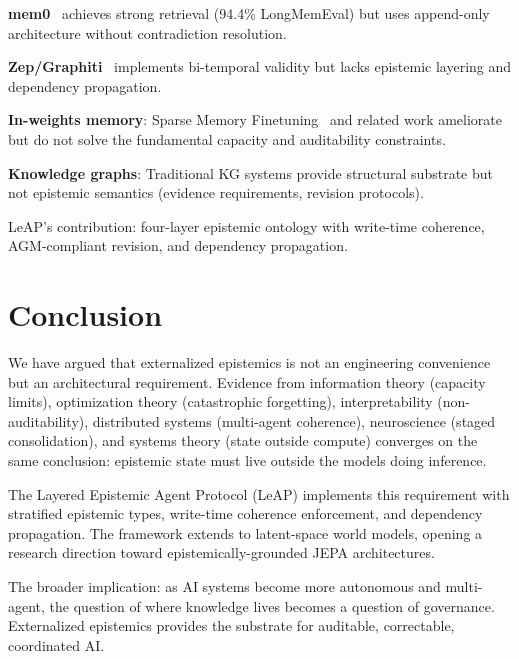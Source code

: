 \documentclass[11pt,letterpaper]{article}
\begin{document}
\textbf{mem0}~\cite{mem0} achieves strong retrieval (94.4\% LongMemEval) but uses append-only architecture without contradiction resolution.

\textbf{Zep/Graphiti}~\cite{graphiti2025} implements bi-temporal validity but lacks epistemic layering and dependency propagation.

\textbf{In-weights memory}: Sparse Memory Finetuning~\cite{sparsemem2025} and related work ameliorate but do not solve the fundamental capacity and auditability constraints.

\textbf{Knowledge graphs}: Traditional KG systems provide structural substrate but not epistemic semantics (evidence requirements, revision protocols).

LeAP's contribution: four-layer epistemic ontology with write-time coherence, AGM-compliant revision, and dependency propagation.

\section{Conclusion}

We have argued that externalized epistemics is not an engineering convenience but an architectural requirement. Evidence from information theory (capacity limits), optimization theory (catastrophic forgetting), interpretability (non-auditability), distributed systems (multi-agent coherence), neuroscience (staged consolidation), and systems theory (state outside compute) converges on the same conclusion: epistemic state must live outside the models doing inference.

The Layered Epistemic Agent Protocol (LeAP) implements this requirement with stratified epistemic types, write-time coherence enforcement, and dependency propagation. The framework extends to latent-space world models, opening a research direction toward epistemically-grounded JEPA architectures.

The broader implication: as AI systems become more autonomous and multi-agent, the question of where knowledge lives becomes a question of governance. Externalized epistemics provides the substrate for auditable, correctable, coordinated AI.
\end{document}
